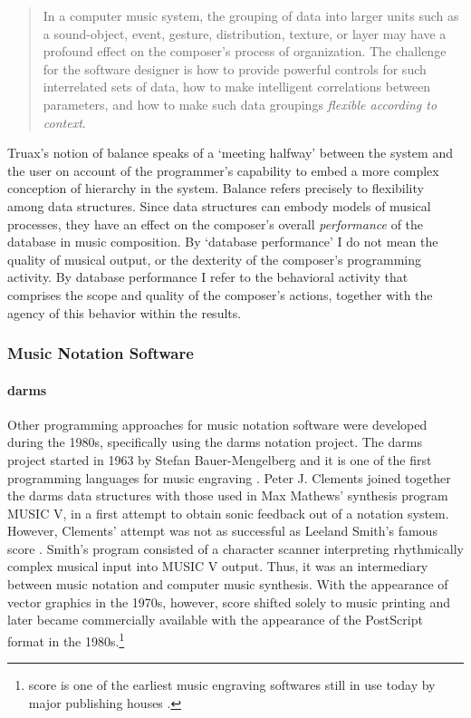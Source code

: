 	\begin{quote}
		In a computer music system, the grouping of data into larger units such as a sound-object, event, gesture, distribution, texture, or layer may have a profound effect on the composer's process of organization. The challenge for the software designer is how to provide powerful controls for such interrelated sets of data, how to make intelligent correlations between parameters, and how to make such data groupings \textit{flexible according to context}. \im \parencite[157]{Emm86:The}
	\end{quote}

	Truax's notion of balance speaks of a `meeting halfway' between the system and the user on account of the programmer's capability to embed a more complex conception of hierarchy in the system. Balance refers precisely to flexibility among data structures. Since data structures can embody models of musical processes, they have an effect on the composer's overall \textit{performance} of the database in music composition. By `database performance' I do not mean the quality of musical output, or the dexterity of the composer's programming activity. By database performance I refer to the behavioral activity that comprises the scope and quality of the composer's actions, together with the agency of this behavior within the results. 

\subsubsection{Music Notation Software}

	\paragraph{\gls{darms}}
	\label{computer:notation}

	Other programming approaches for music notation software were developed during the 1980s, specifically using the \gls{darms} notation project. The \gls{darms} project started in 1963 by Stefan Bauer-Mengelberg and it is one of the first programming languages for music engraving \parencite{icmc/bbp2372.1983.002, 10.2307/30204239}. Peter J. Clements \parencite{icmc/bbp2372.1980.020} joined together the \gls{darms} data structures with those used in Max Mathews' synthesis program MUSIC V, in a first attempt to obtain sonic feedback out of a notation system. However, Clements' attempt was not as successful as Leeland Smith's famous \gls{score} \parencite{smith1971}. Smith's program consisted of a character scanner interpreting rhythmically complex musical input into MUSIC V output. Thus, it was an intermediary between music notation and computer music synthesis. With the appearance of vector graphics in the 1970s, however, \gls{score} shifted solely to music printing and later became commercially available with the appearance of the 	PostScript format in the 1980s.\footnote{\gls{score} is one of the earliest music engraving softwares still in use today by major publishing houses \parencite{scoremus}.}

